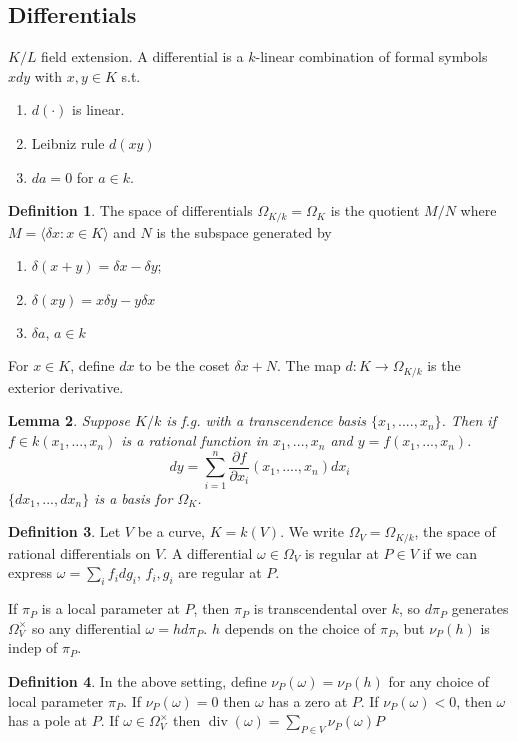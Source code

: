 \documentclass{article}
\theoremstyle{definition}
\newtheorem{defn}{Definition}[section]
\theoremstyle{remark}
\theoremstyle{plain}
\newtheorem{lem}[defn]{Lemma}
\newcommand{\divi}{\operatorname{div}}
\begin{document}
\subsection{Differentials}
$K/L$ field extension.
    A differential is a $k$-linear combination of formal symbols $xdy$ with $x,y\in K$ s.t. 
    \begin{enumerate}[(1)]
        \item $d(\cdot)$ is linear.
        \item Leibniz rule $d(xy)$
        \item $da=0$ for $a\in k$.
    \end{enumerate}
\begin{defn}
    The space of differentials $\Omega_{K/k}=\Omega_K$ is the quotient $M/N$ where $M=\langle\delta x:x\in K\rangle$ and $N$ is the subspace generated by
    \begin{enumerate}[(1)]
        \item $\delta(x+y)=\delta x-\delta y$;
        \item $\delta(xy)=x\delta y-y\delta x$
        \item $\delta a$, $a\in k$
    \end{enumerate}
    For $x\in K$, define $dx$ to be the coset $\delta x+N$. The map $d:K\to\Omega_{K/k}$ is the exterior derivative.
\end{defn}
\begin{lem}
    Suppose $K/k$ is f.g. with a transcendence basis $\{x_1,....,x_n\}$. Then if $f\in k(x_1,...,x_n)$ is a rational function in $x_1,...,x_n$ and $y=f(x_1,...,x_n)$.
    \[dy=\sum_{i=1}^n\frac{\partial f}{\partial x_i}(x_1,....,x_n)dx_i\]
    $\{dx_1,...,dx_n\}$ is a basis for $\Omega_K$.
\end{lem}
\begin{defn}
    Let $V$ be a curve, $K=k(V)$. We write $\Omega_V=\Omega_{K/k}$, the space of rational differentials on $V$. A differential $\omega\in\Omega_V$ is regular at $P\in V$ if we can express $\omega=\sum_i f_idg_i$, $f_i,g_i$ are regular at $P$.
\end{defn}
If $\pi_P$ is a local parameter at $P$, then $\pi_P$ is transcendental over $k$, so $d\pi_P$ generates $\Omega_V^\times$ so any differential $\omega=hd\pi_P$. $h$ depends on the choice of $\pi_P$, but $\nu_P(h)$ is indep of $\pi_P$.
\begin{defn}
    In the above setting, define $\nu_P(\omega)=\nu_P(h)$ for any choice of local parameter $\pi_P$. If $\nu_P(\omega)=0$ then $\omega$ has a zero at $P$. If $\nu_P(\omega)<0$, then $\omega$ has a pole at $P$. If $\omega\in\Omega_V^\times$ then $\divi(\omega)=\sum_{P\in V}\nu_P(\omega)P$
\end{defn}
\end{document}
